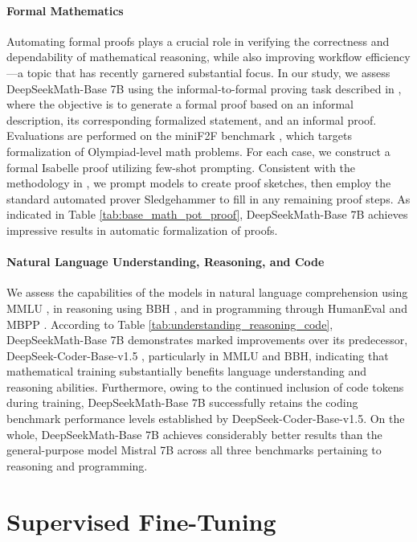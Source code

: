 \begin{itemize}[topsep=0pt]
\paragraph{Formal Mathematics}

Automating formal proofs plays a crucial role in verifying the correctness and dependability of mathematical reasoning, while also improving workflow efficiency—a topic that has recently garnered substantial focus. In our study, we assess DeepSeekMath-Base 7B using the informal-to-formal proving task described in \citep{dsp_proof}, where the objective is to generate a formal proof based on an informal description, its corresponding formalized statement, and an informal proof. Evaluations are performed on the miniF2F benchmark \citep{minif2f}, which targets formalization of Olympiad-level math problems. For each case, we construct a formal Isabelle proof utilizing few-shot prompting. Consistent with the methodology in \cite{dsp_proof}, we prompt models to create proof sketches, then employ the standard automated prover Sledgehammer \citep{sledgehammer} to fill in any remaining proof steps. As indicated in Table \ref{tab:base_math_pot_proof}, DeepSeekMath-Base 7B achieves impressive results in automatic formalization of proofs.

\paragraph{Natural Language Understanding, Reasoning, and Code}

We assess the capabilities of the models in natural language comprehension using MMLU \citep{mmlu}, in reasoning using BBH \citep{bbh}, and in programming through HumanEval \citep{codex} and MBPP \citep{mbpp}. According to Table \ref{tab:understanding_reasoning_code}, DeepSeekMath-Base 7B demonstrates marked improvements over its predecessor, DeepSeek-Coder-Base-v1.5 \citep{deepseek-coder}, particularly in MMLU and BBH, indicating that mathematical training substantially benefits language understanding and reasoning abilities. Furthermore, owing to the continued inclusion of code tokens during training, DeepSeekMath-Base 7B successfully retains the coding benchmark performance levels established by DeepSeek-Coder-Base-v1.5. On the whole, DeepSeekMath-Base 7B achieves considerably better results than the general-purpose model Mistral 7B \citep{mistral} across all three benchmarks pertaining to reasoning and programming.

\section{Supervised Fine-Tuning}


\end{itemize}
